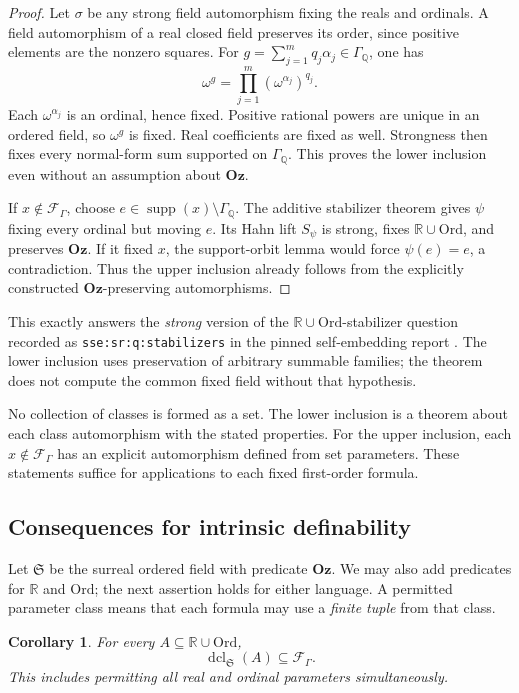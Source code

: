 \documentclass[11pt,a4paper]{article}
\numberwithin{equation}{section}
\newtheorem{corollary}[corollary]{Corollary}
\theoremstyle{definition}
\theoremstyle{remark}
\newcommand{\Oz}{\mathbf{Oz}}
\newcommand{\Ord}{\mathrm{Ord}}
\newcommand{\Q}{\mathbb Q}
\newcommand{\R}{\mathbb R}
\newcommand{\supp}{\operatorname{supp}}
\begin{document}
\begin{proof}
Let \(\sigma\) be any strong field automorphism fixing the reals and
ordinals. A field automorphism of a real closed field preserves its
order, since positive elements are the nonzero squares. For
\(g=\sum_{j=1}^{m}q_j\alpha_j\in \Gamma_{\Q}\), one has
\[
 \omega^g=\prod_{j=1}^{m}(\omega^{\alpha_j})^{q_j}.
\]
Each \(\omega^{\alpha_j}\) is an ordinal, hence fixed. Positive
rational powers are unique in an ordered field, so \(\omega^g\)
is fixed. Real coefficients are fixed as well. Strongness then fixes
every normal-form sum supported on \(\Gamma_{\Q}\). This proves the lower
inclusion even without an assumption about \(\Oz\).

If \(x\notin\mathcal F_\Gamma\), choose \(e\in\supp(x)\setminus \Gamma_{\Q}\).
The additive stabilizer theorem gives \(\psi\) fixing every ordinal
but moving \(e\). Its Hahn lift \(S_\psi\) is strong, fixes
\(\R\cup\Ord\), and preserves \(\Oz\). If it fixed \(x\), the
support-orbit lemma would force \(\psi(e)=e\), a contradiction.
Thus the upper inclusion already follows from the explicitly
constructed \(\Oz\)-preserving automorphisms.
\end{proof}

This exactly answers the \emph{strong} version of the
\(\R\cup\Ord\)-stabilizer question recorded as
\texttt{sse:sr:q:stabilizers} in the pinned self-embedding report
\cite{RepoSse}. The lower inclusion uses preservation of
arbitrary summable families; the theorem does not compute the common
fixed field without that hypothesis.

No collection of classes is formed as a set. The lower inclusion is
a theorem about each class automorphism with the stated properties.
For the upper inclusion, each \(x\notin\mathcal F_\Gamma\) has an explicit
automorphism defined from set parameters. These statements suffice
for applications to each fixed first-order formula.

\subsection{Consequences for intrinsic definability}

Let \(\mathfrak S\) be the surreal ordered field with predicate \(\Oz\).
We may also add predicates for \(\R\) and \(\Ord\); the next assertion
holds for either language. A permitted parameter class means that each
formula may use a \emph{finite tuple} from that class.

\begin{corollary}\label{dsn:rp:cor:dcl-bound}
For every \(A\subseteq\R\cup\Ord\),
\[
 \operatorname{dcl}_{\mathfrak S}(A)\subseteq\mathcal F_\Gamma.
\]
This includes permitting all real and ordinal parameters simultaneously.
\end{corollary}
\end{document}
